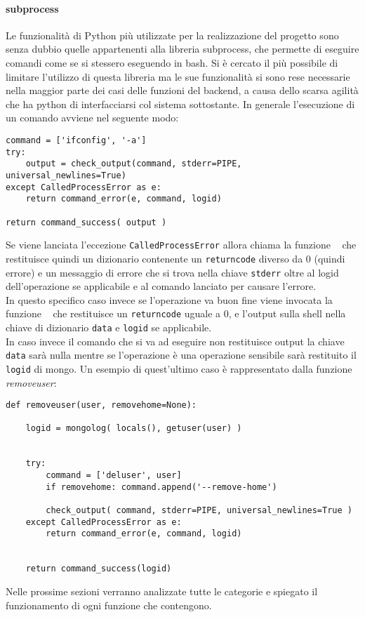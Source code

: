 \documentclass[11pt]{article}
\begin{document}
\paragraph{subprocess}\label{subprocess}
Le funzionalità di Python più utilizzate per la realizzazione del progetto sono senza dubbio quelle appartenenti alla libreria subprocess,
che permette di eseguire comandi come se si stessero eseguendo in bash. Si è cercato il più possibile di limitare l'utilizzo di questa libreria
ma le sue funzionalità si sono rese necessarie nella maggior parte dei casi delle funzioni del backend,
a causa dello scarsa agilità che ha python di interfacciarsi col sistema sottostante.
In generale l'esecuzione di un comando avviene nel seguente modo:
\begin{lstlisting}
command = ['ifconfig', '-a']
try:
	output = check_output(command, stderr=PIPE, universal_newlines=True)
except CalledProcessError as e:
	return command_error(e, command, logid)

return command_success( output )
\end{lstlisting}
Se viene lanciata l'eccezione \texttt{CalledProcessError} allora chiama la funzione \texttt{  }
che restituisce quindi un dizionario contenente un \texttt{returncode} diverso da 0 (quindi errore)
e un messaggio di errore che si trova nella chiave \texttt{stderr} oltre al logid dell'operazione se applicabile e al comando lanciato
per causare l'errore. \\
In questo specifico caso invece se l'operazione va buon fine viene invocata la funzione \texttt{  }
che restituisce un \texttt{returncode} uguale a 0, e l'output sulla shell nella chiave di dizionario  \texttt{data} e \texttt{logid}
se applicabile. \\
In caso invece il comando che si va ad eseguire non restituisce output la chiave \texttt{data} sarà nulla mentre se l'operazione è una
operazione sensibile sarà restituito il \texttt{logid} di mongo.
Un esempio di quest'ultimo caso è rappresentato dalla funzione \textit{removeuser}:
\begin{lstlisting}
def removeuser(user, removehome=None):
        
    logid = mongolog( locals(), getuser(user) )
    

    try:
        command = ['deluser', user]
        if removehome: command.append('--remove-home') 

        check_output( command, stderr=PIPE, universal_newlines=True )
    except CalledProcessError as e:
        return command_error(e, command, logid)
    
    
    return command_success(logid)
\end{lstlisting}
Nelle prossime sezioni verranno analizzate tutte le categorie e spiegato il funzionamento di ogni funzione che contengono.
\end{document}
